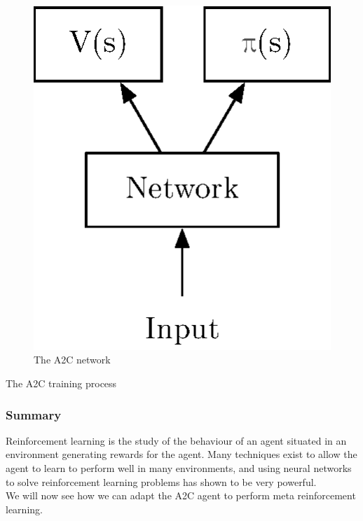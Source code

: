 \begin{figure}[]
	\centering
	\includegraphics[width=0.2\linewidth]{fig/a3c.eps}
	\caption{The A2C network}
	\label{fig:a2c}
\end{figure}

\begin{algorithm}
\caption{The A2C training process}
\label{algo:a2c}
\begin{algorithmic}[1]
	\Statex
	\EndWhile
	\Statex
	\EndFor
	\Statex
\EndWhile

\end{algorithmic}
\end{algorithm}

\subsubsection{Summary}
Reinforcement learning is the study of the behaviour of an agent situated in
an environment generating rewards for the agent. Many techniques exist
to allow the agent to learn to perform well in many environments, and 
using neural networks to solve reinforcement learning problems has shown
to be very powerful.\\

We will now see how we can adapt the A2C agent to perform meta reinforcement
learning.


